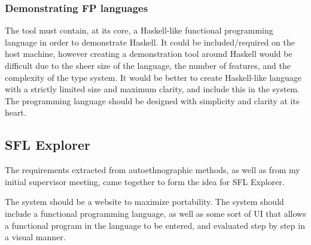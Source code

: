 \subsubsection{Demonstrating \ac{FP} languages} The tool must contain, at its core, a Haskell-like functional programming language in order to demonstrate Haskell. It could be included/required on the host machine, however creating a demonstration tool around Haskell would be difficult due to the sheer size of the language, the number of features, and the complexity of the type system. It would be better to create Haskell-like language with a strictly limited size and maximum clarity, and include this in the system. The programming language should be designed with simplicity and clarity at its heart.

\subsection{SFL Explorer}
The requirements extracted from autoethnographic methods, as well as from my initial supervisor meeting, came together to form the idea for SFL Explorer. 

The system should be a website to maximize portability. The system should include a functional programming language, as well as some sort of UI that allows a functional program in the language to be entered, and evaluated step by step in a visual manner. 


